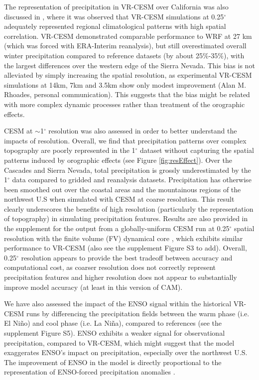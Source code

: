 \documentclass{ametsoc}
\begin{document}
The representation of precipitation in VR-CESM over California was also discussed in \cite{huang2016evaluation}, where it was observed that VR-CESM simulations at 0.25$^\circ$ adequately represented regional climatological patterns with high spatial correlation. VR-CESM demonstrated comparable performance to WRF at 27 km (which was forced with ERA-Interim reanalysis), but still overestimated overall winter precipitation compared to reference datasets (by about 25$\%$-35$\%$), with the largest differences over the western edge of the Sierra Nevada.  This bias is not alleviated by simply increasing the spatial resolution, as experimental VR-CESM simulations at 14km, 7km and 3.5km show only modest improvement (Alan M. Rhoades, personal communication).  This suggests that the bias might be related with more complex dynamic processes rather than treatment of the orographic effects. 


CESM at $\sim$1$^\circ$ resolution was also assessed in order to better understand the impacts of resolution. Overall, we find that precipitation patterns over complex topography are poorly represented in the 1$^\circ$ dataset without capturing the spatial patterns induced by orographic effects (see Figure \ref{fig:resEffect}).  Over the Cascades and Sierra Nevada, total precipitation is grossly underestimated by the 1$^\circ$ data compared to gridded and reanalysis datasets. Precipitation has otherwise been smoothed out over the coastal areas and the mountainous regions of the northwest U.S when simulated with CESM at coarse resolution.  This result clearly underscores the benefits of high resolution (particularly the representation of topography) in simulating precipitation features.  Results are also provided in the supplement for the output from a globally-uniform CESM run at 0.25$^\circ$ spatial resolution with the finite volume (FV) dynamical core \citep{wehner2014effect}, which exhibits similar performance to VR-CESM (also see the supplement Figure S3 {\color{red}to add}).  Overall, 0.25$^\circ$ resolution appears to provide the best tradeoff between accuracy and computational cost, as coarser resolution does not correctly represent precipitation features and higher resolution does not appear to substantially improve model accuracy (at least in this version of CAM).


We have also assessed the impact of the ENSO signal within the historical VR-CESM runs by differencing the precipitation fields between the warm phase (i.e. El Ni\~no) and cool phase (i.e. La Ni\~na), compared to references (see the supplement Figure S5). ENSO exhibits a weaker signal for observational precipitation, compared to VR-CESM, which might suggest that the model exaggerates ENSO's impact on precipitation, especially over the northwest U.S. The improvement of ENSO in the model is directly proportional to the representation of ENSO-forced precipitation anomalies \citep{achutarao2006enso}.
\end{document}
